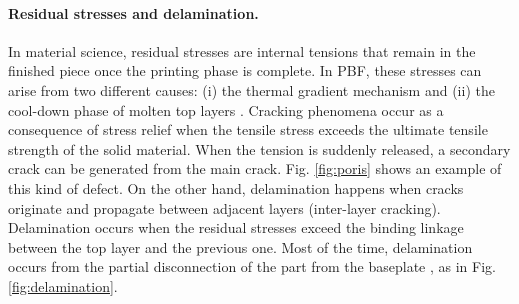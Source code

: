 \paragraph{Residual stresses and delamination.} In material science, residual stresses are internal tensions that remain in the finished piece once the printing phase is complete. In PBF, these stresses can arise from two different causes: (i) the thermal gradient mechanism and (ii) the cool-down phase of molten top layers \cite{mercelis_residual_2006}. Cracking phenomena occur as a consequence of stress relief when the tensile stress exceeds the ultimate tensile strength of the solid material. When the tension is suddenly released, a secondary crack can be generated from the main crack. Fig. \ref{fig:poris} shows an example of this kind of defect. On the other hand, delamination happens when cracks originate and propagate between adjacent layers (inter-layer cracking). Delamination occurs when the residual stresses exceed the binding linkage between the top layer and the previous one. Most of the time, delamination occurs from the partial disconnection of the part from the baseplate \cite{sames_metallurgy_2016}, as in Fig. \ref{fig:delamination}.
